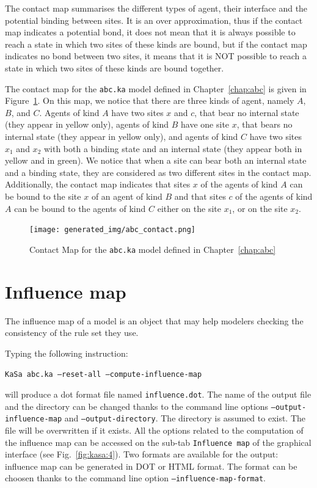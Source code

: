 \documentclass[11pt]{book}
\def\ttt#1{\texttt{#1}}
\begin{document}
The contact map summarises the different types of agent, their interface and the potential binding between sites. It is an over approximation, thus if the contact map indicates a potential bond, it does not mean that it is always possible to reach a state in which two sites of these kinds are bound, but if the contact map indicates no bond between two sites, it means that it is NOT possible to reach a state in which two sites of these kinds are bound together.


The contact map for the \ttt{abc.ka} model  defined in Chapter~\ref{chap:abc} is given in Figure~\ref{fig:abc-contact}. On this map, we notice that there are three kinds of agent, namely $A$, $B$, and $C$.
Agents of kind $A$ have two sites $x$ and $c$, that bear no internal state (they appear in yellow only), agents of kind $B$ have one site $x$, that bears no internal state (they appear in yellow only), and agents of kind $C$ have two sites $x_1$ and $x_2$ with both a binding state and an internal state (they appear both in yellow and in green). We notice that when a site can bear both an internal state and a binding state, they are considered as two different sites in the contact map. Additionally, the contact map indicates that sites $x$ of the agents of kind $A$ can be bound to the site $x$ of an agent of kind $B$ and that sites $c$ of the agents of kind $A$ can be bound to the agents of kind $C$ either on the site $x_1$, or on the site $x_2$.

\begin{figure}[htbp]
\centering
\texttt{[image: generated\_img/abc\_contact.png]}
\caption{Contact Map for the \ttt{abc.ka} model defined in Chapter~\ref{chap:abc}}
\label{fig:abc-contact}
\end{figure}



\section{Influence map}

The influence map of a model is an object that may help modelers checking the consistency of the rule set they use.

Typing the following instruction:

\texttt{KaSa abc.ka --reset-all --compute-influence-map}

will produce a dot format file named \texttt{influence.dot}.
The name of the output file and the directory can be changed thanks to the command line options \texttt{--output-influence-map} and \texttt{--output-directory}.
The directory is assumed to exist. The file will be overwritten if it exists.  All the options related to the computation of the influence map can be accessed on the sub-tab \texttt{Influence map} of the graphical interface (see Fig.~\ref{fig:kasa:4}). Two formats are available for the output: influence map can be generated in DOT or HTML format. The format can be choosen thanks to the command line option \texttt{--influence-map-format}.
\end{document}
